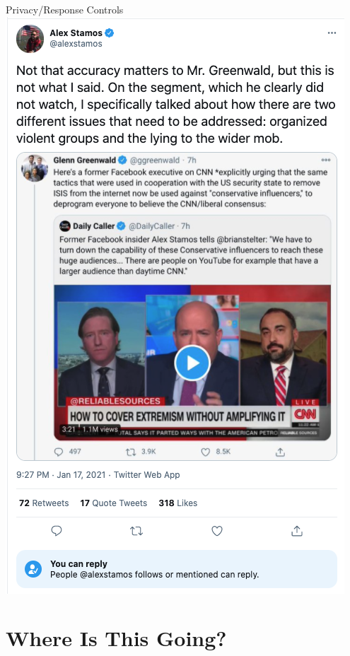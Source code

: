 \documentclass[nobackground,dvipsnames,table,aspectratio=169]{beamer}
\begin{document}
\begin{frame}{Privacy/Response Controls}
    \centering
    \includegraphics[height=0.85\textheight]{greenwald-tweets}
\end{frame}

\section{Where Is This Going?}
\end{document}
